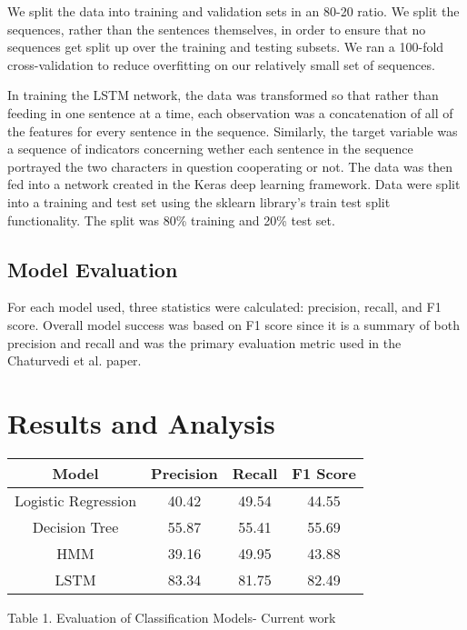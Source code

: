 \documentclass[11pt,a4paper]{article}
\begin{document}
We split the data into training and validation sets in an 80-20 ratio. We split the sequences, rather than the sentences themselves, in order to ensure that no sequences get split up over the training and testing subsets. We ran a 100-fold cross-validation to reduce overfitting on our relatively small set of sequences.

In training the LSTM network, the data was transformed so that rather than feeding in one sentence at a time, each observation was a concatenation of all of the features for every sentence in the sequence. Similarly, the target variable was a sequence of indicators concerning wether each sentence in the sequence portrayed the two characters in question cooperating or not. The data was then fed into a network created in the Keras deep learning framework. Data were split into a training and test set using the sklearn library's train test split functionality. The split was 80\% training and 20\% test set.

\subsection{Model Evaluation}

For each model used, three statistics were calculated: precision, recall, and F1 score. Overall model success was based on F1 score since it is a summary of both precision and recall and was the primary evaluation metric used in the Chaturvedi et al. paper.

\section{Results and Analysis}

\begin{center}
 \begin{tabular}{||c c c c||} 
 \hline
 Model & Precision & Recall & F1 Score \\ [0.5ex] 
 \hline\hline
 Logistic Regression & 40.42 & 49.54 & 44.55 \\ 
 \hline
 Decision Tree & 55.87 & 55.41 & 55.69 \\
 \hline
 HMM & 39.16 & 49.95 & 43.88 \\
 \hline
 LSTM & 83.34 & 81.75 & 82.49 \\
 \hline
\end{tabular}
\caption{Table 1. Evaluation of Classification Models- Current work}
\label{table:1}
\end{center}
\end{document}
